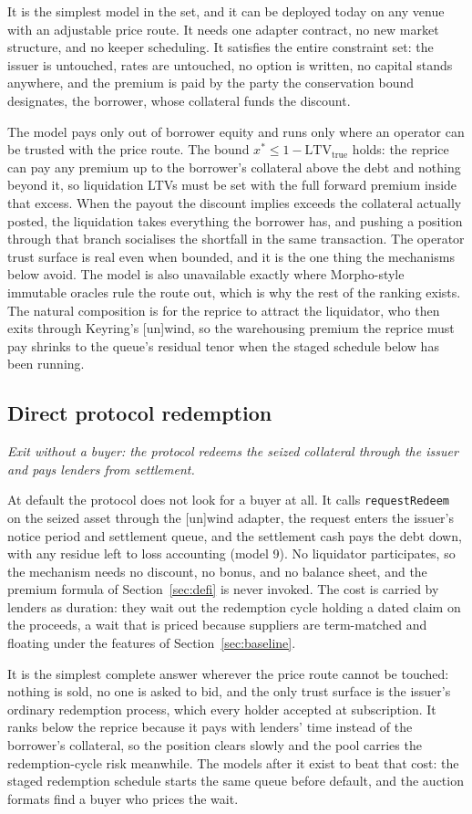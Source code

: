 \documentclass[11pt,a4paper]{article}
\newcommand{\model}[2]{\subsection{#1}\noindent\textit{#2}\medskip}
\begin{document}
It is the simplest model in the set, and it can be deployed today on any venue with an adjustable price route. It needs one adapter contract, no new market structure, and no keeper scheduling. It satisfies the entire constraint set: the issuer is untouched, rates are untouched, no option is written, no capital stands anywhere, and the premium is paid by the party the conservation bound designates, the borrower, whose collateral funds the discount.

The model pays only out of borrower equity and runs only where an operator can be trusted with the price route. The bound $x^* \le 1 - \mathrm{LTV}_{\text{true}}$ holds: the reprice can pay any premium up to the borrower's collateral above the debt and nothing beyond it, so liquidation LTVs must be set with the full forward premium inside that excess. When the payout the discount implies exceeds the collateral actually posted, the liquidation takes everything the borrower has, and pushing a position through that branch socialises the shortfall in the same transaction. The operator trust surface is real even when bounded, and it is the one thing the mechanisms below avoid. The model is also unavailable exactly where Morpho-style immutable oracles rule the route out, which is why the rest of the ranking exists. The natural composition is for the reprice to attract the liquidator, who then exits through Keyring's [un]wind, so the warehousing premium the reprice must pay shrinks to the queue's residual tenor when the staged schedule below has been running.

\model{Direct protocol redemption}{Exit without a buyer: the protocol redeems the seized collateral through the issuer and pays lenders from settlement.}

At default the protocol does not look for a buyer at all. It calls \texttt{requestRedeem} on the seized asset through the [un]wind adapter, the request enters the issuer's notice period and settlement queue, and the settlement cash pays the debt down, with any residue left to loss accounting (model 9). No liquidator participates, so the mechanism needs no discount, no bonus, and no balance sheet, and the premium formula of Section~\ref{sec:defi} is never invoked. The cost is carried by lenders as duration: they wait out the redemption cycle holding a dated claim on the proceeds, a wait that is priced because suppliers are term-matched and floating under the features of Section~\ref{sec:baseline}.

It is the simplest complete answer wherever the price route cannot be touched: nothing is sold, no one is asked to bid, and the only trust surface is the issuer's ordinary redemption process, which every holder accepted at subscription. It ranks below the reprice because it pays with lenders' time instead of the borrower's collateral, so the position clears slowly and the pool carries the redemption-cycle risk meanwhile. The models after it exist to beat that cost: the staged redemption schedule starts the same queue before default, and the auction formats find a buyer who prices the wait.
\end{document}
